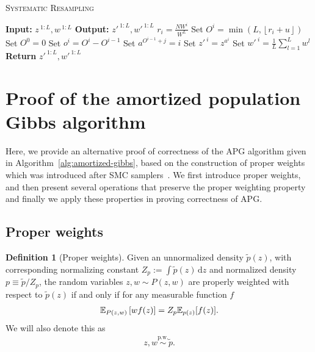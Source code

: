 \documentclass{article}
\theoremstyle{definition}
\newtheorem{definition}{Definition}
\newcommand{\pw}{\overset{\text{p.w.}}{\sim}
}
\begin{document}
\begin{algorithm}[!t]
  \caption{\textsc{Systematic Resampling}}
  \label{alg:resampling_sys}
\begin{algorithmic}[1]
\small
    \State \textbf{Input:} $z^{\:1:L}, w^{\:1:L}$
    \State \textbf{Output:} $z'^{\:1:L}, w'^{\:1:L}$
    \State{$u \sim \mathcal{U}[0,1)$}
        \State $r_i = \frac{N W^i}{W^L}$
        \State Set $O^i = \min(L, \left\lfloor r_i + u \right\rfloor)$  
    \EndFor
    \State Set $O^0 = 0$
        \State Set $o^i= O^i - O^{i-1}$
         
            \State Set $a^{O^{i-1} + j} = i$
    \EndFor
    \State Set $z'^{\:i} = z^{a^i}$
    \State Set $w'^{\:i} = \frac{1}{L} \sum_{l = 1}^L w^l$ 
    \EndFor
    \State \textbf{Return} $z'^{\:1:L}, w'^{\:1:L}$
\end{algorithmic}
\end{algorithm}

\section{Proof of the amortized population Gibbs algorithm}
\label{appendix:proof-algo}

Here, we provide an alternative proof of correctness of the APG algorithm given in Algorithm~\ref{alg:amortized-gibbs}, based on the construction of proper weights~\cite{naesseth2015nested} which was introduced after SMC samplers~\cite{delmoral2006sequential}.
We first introduce proper weights, and then present several operations that preserve the proper weighting property and finally we apply these properties in proving correctness of APG.

\subsection{Proper weights}

\begin{definition}[Proper weights]
    Given an unnormalized density $\tilde p(z)$, with corresponding normalizing constant $Z_p := \int \tilde p(z) \,\mathrm dz$ and normalized density $p \equiv \tilde p / Z_p$, the random variables $z, w \sim P(z, w)$ are properly weighted with respect to $\tilde p(z)$ if and only if for any measurable function $f$
    \begin{align}
    \label{eq:pw}
    \mathbb{E}_{P(z, w)}\left[w f(z)\right] = Z_p \mathbb{E}_{p(z)}[f(z)]. 
    \end{align}
    We will also denote this as
    \begin{align*}
        z, w \pw \tilde p.
    \end{align*}
\end{definition}
\end{document}
